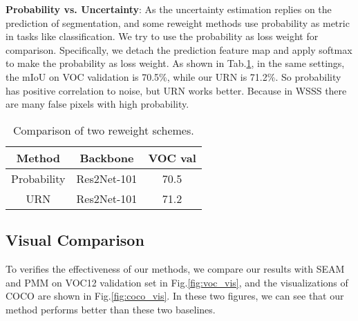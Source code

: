\noindent \textbf{Probability vs. Uncertainty}: As the uncertainty estimation replies on the prediction of segmentation, and some reweight methods use probability as metric in tasks like classification. We try to use the probability as loss weight for comparison. Specifically, we detach the prediction feature map and apply softmax to make the probability as loss weight. As shown in Tab.\ref{tab:prob}, in the same settings, the mIoU on VOC validation is 70.5\%, while our URN is 71.2\%. So probability has positive correlation to noise, but URN works better. Because in WSSS there are many false pixels with high probability.
\begin{table}[t]
\begin{centering}
\begin{tabular}{ccc}
\hline 
Method  & Backbone & VOC val\tabularnewline
\hline 
\hline 
Probability & Res2Net-101 & 70.5\tabularnewline
URN & Res2Net-101  & 71.2\tabularnewline
\hline 
\end{tabular}
\par\end{centering}
\caption{\label{tab:prob}Comparison of two reweight schemes.}
\end{table}

\subsection{Visual Comparison}
To verifies the effectiveness of our methods, we compare our results with SEAM and PMM on VOC12 validation set in Fig.\ref{fig:voc_vis}, and the visualizations of COCO are shown in Fig.\ref{fig:coco_vis}. In these two figures, we can see that our method performs better than these two baselines.

